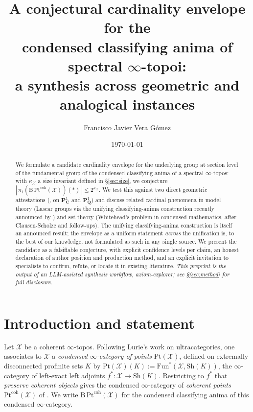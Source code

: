 \documentclass[11pt]{article}
\title{A conjectural cardinality envelope for the\\
  condensed classifying anima of spectral $\infty$-topoi:\\
  a synthesis across geometric and analogical instances}
\author[1]{Francisco Javier Vera G\'omez}
\affil[1]{Independent researcher\\
\href{https://orcid.org/0009-0001-3516-5871}{ORCID: 0009-0001-3516-5871}\\
Repository:
\href{https://gitlab.loneorc.com/research/axiom-explorer}{gitlab.loneorc.com/research/axiom-explorer}\\
Version: v1.2.1-preprint}
\date{\today}
\theoremstyle{definition}
\theoremstyle{plain}
\theoremstyle{remark}
\newcommand{\Pt}{\mathrm{Pt}}
\newcommand{\Bcat}{\mathrm{B}}
\newcommand{\Sh}{\mathrm{Sh}}
\newcommand{\Pone}{\mathbf{P}^{1}}
\newcommand{\C}{\mathbf{C}}
\newcommand{\Q}{\mathbf{Q}}
\begin{document}
\maketitle

\begin{abstract}
We formulate a candidate cardinality envelope for the underlying group at section
level of the fundamental group of the condensed classifying anima of a spectral
$\infty$-topos: with $\kappa_{\mathcal X}$ a size invariant defined in
\S\ref{sec:size}, we conjecture
$|\,\pi_1(\Bcat\,\Pt^{\mathrm{coh}}(\mathcal X))(\ast)\,| \le 2^{\kappa_{\mathcal X}}$.
We test this against two direct geometric attestations (\cite{HHLMMW2025}, on
$\Pone_{\C}$ and $\Pone_{\Q}$) and discuss related cardinal phenomena in
model theory (Lascar groups via the unifying classifying-anima construction
recently announced by \cite{Haine2026classifying}) and set theory (Whitehead's
problem in condensed mathematics, after Clausen-Scholze and follow-ups).
The unifying classifying-anima construction is itself an announced result; the
envelope as a uniform statement \emph{across} the unification is, to the best
of our knowledge, not formulated as such in any single source. We present the
candidate as a falsifiable conjecture, with explicit confidence levels per
claim, an honest declaration of author position and production method, and an
explicit invitation to specialists to confirm, refute, or locate it in
existing literature. \emph{This preprint is the output of an LLM-assisted
synthesis workflow, axiom-explorer; see \S\ref{sec:method} for full
disclosure.}
\end{abstract}

\section{Introduction and statement}\label{sec:intro}

Let $\mathcal{X}$ be a coherent $\infty$-topos. Following Lurie's work on
ultracategories, one associates to $\mathcal{X}$ a \emph{condensed
$\infty$-category of points} $\Pt(\mathcal{X})$, defined on extremally
disconnected profinite sets $K$ by
$\Pt(\mathcal{X})(K) := \mathrm{Fun}^{\ast}(\mathcal{X}, \Sh(K))$, the
$\infty$-category of left-exact left adjoints
$f^{\ast}: \mathcal{X} \to \Sh(K)$. Restricting to $f^{\ast}$ that
\emph{preserve coherent objects} gives the condensed $\infty$-category of
\emph{coherent points} $\Pt^{\mathrm{coh}}(\mathcal{X})$ of
\cite{BarwickGlasmanHaine2018}. We write
$\Bcat\,\Pt^{\mathrm{coh}}(\mathcal{X})$ for the condensed classifying anima of
this condensed $\infty$-category.
\end{document}
